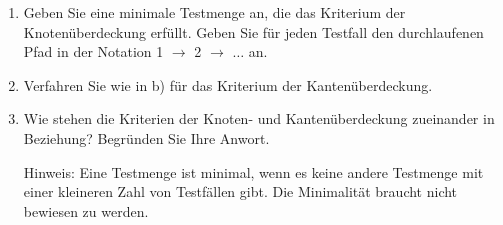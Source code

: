 \documentclass{lehramt-informatik-aufgabe}
\begin{document}
\begin{enumerate}

\item Geben Sie eine minimale Testmenge an, die das Kriterium der
Knotenüberdeckung erfüllt. Geben Sie für jeden Testfall den
durchlaufenen Pfad in der Notation 1 $\rightarrow$ 2 $\rightarrow$
$\dots$ an.


\item Verfahren Sie wie in b) für das Kriterium der Kantenüberdeckung.


\item Wie stehen die Kriterien der Knoten- und Kantenüberdeckung
zueinander in Beziehung? Begründen Sie Ihre Anwort.

Hinweis: Eine Testmenge ist minimal, wenn es keine andere Testmenge mit
einer kleineren Zahl von Testfällen gibt. Die Minimalität braucht nicht
bewiesen zu werden.

\end{enumerate}
\end{document}
